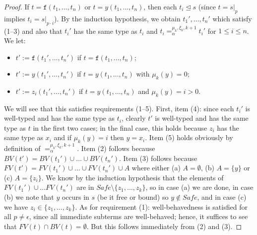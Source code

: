 \documentclass{lmcs}
\theoremstyle{theorem}\newtheorem{theorem}[dummy]{Theorem}
\theoremstyle{theorem}\newtheorem{lemma}[dummy]{Lemma}
\theoremstyle{theorem}\newtheorem{corollary}[dummy]{Corollary}
\theoremstyle{definition}\newtheorem{definition}[dummy]{Definition}
\theoremstyle{definition}\newtheorem{example}[dummy]{Example}
\newcommand{\FV}{\mathit{FV}}
\newcommand{\BV}{\mathit{BV}}
\newcommand{\identifier}[1]{\mathtt{#1}}
\newcommand{\afun}{\identifier{f}}
\newcommand{\avar}{x}
\newcommand{\bvar}{y}
\newcommand{\cvar}{z}
\newcommand{\subtermeq}{\unlhd}
\begin{document}
\begin{proof}
If $t = \afun(t_1,\dots,t_n)$ or $t = \bvar(t_1,\dots,t_n)$, then each $t_i \subtermeq s$ (since
$t = s|_p$ implies $t_i = s|_{p \cdot i}$).  By the induction hypothesis, we obtain $t_1',\dots,
t_n'$ which satisfy (1--3) and also that $t_i'$ has the same type as $t_i$ and $t_i
=_\alpha^{\mu_k,\xi_k,k+1} t_i'$ for $1 \leq i \leq n$.
We let:
\begin{itemize}
\item $t' := \afun(t_1',\dots,t_n')$ if $t = \afun(t_1,\dots,t_n)$;
\item $t' := \bvar(t_1',\dots,t_n')$ if $t = \bvar(t_1,\dots,t_n)$ with $\mu_k(\bvar) = 0$;
\item $t' := \cvar_i(t_1',\dots,t_n')$ if $t = \bvar(t_1,\dots,t_n)$ and $\mu_k(\bvar) = i > 0$.
\end{itemize}
We will see that this satisfies requirements (1--5).  First, item (4): since each $t_i'$ is
well-typed and has the same type as $t_i$, clearly $t'$ is well-typed and has the same type as
$t$ in the first two cases; in the final case, this holds because $\cvar_i$ has the same type as
$\avar_i$ and if $\mu_k(\bvar) = i$ then $\bvar = \avar_i$.  Item (5) holds obviously by definition
of $=_\alpha^{\mu_k,\xi_k,k+1}$.  Item (2) follows because $\BV(t') = \BV(t_1') \cup \dots \cup
\BV(t_n')$.  Item (3) follows because $\FV(t') = \FV(t_1') \cup \dots \cup \FV(t_n') \cup A$ where
either (a) $A = \emptyset$, (b) $A = \{\bvar\}$ or (c) $A = \{\cvar_i\}$.  We know by the induction
hypothesis that the elements of $\FV(t_1') \cup \dots \FV(t_n')$ are in $\mathit{Safe} \setminus
\{\cvar_1,\dots,\cvar_k\}$, so in case (a) we are done, in case (b) we note that $\bvar$ occurs in
$s$ (be it free or bound) so $\bvar \notin \mathit{Safe}$, and in case (c) we have $\cvar_i \in
\{\cvar_1,\dots,\cvar_k\}$.
As for requirement (1): well-behavedness is satisfied for all $p \neq \epsilon$, since all
immediate subterms are well-behaved; hence, it suffices to see that $\FV(t) \cap \BV(t) =
\emptyset$.  But this follows immediately from (2) and (3).


\end{proof}
\end{document}
